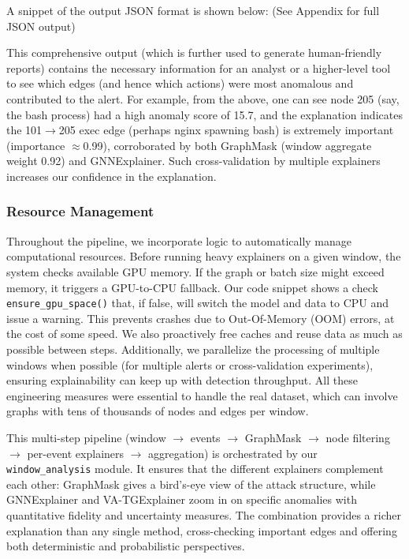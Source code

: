 \documentclass[conference]{IEEEtran}
\begin{document}
A snippet of the output JSON format is shown below:
(See Appendix for full JSON output)

This comprehensive output (which is further used to generate human-friendly reports) contains the necessary information for an analyst or a higher-level tool to see which edges (and hence which actions) were most anomalous and contributed to the alert. For example, from the above, one can see node 205 (say, the bash process) had a high anomaly score of 15.7, and the explanation indicates the 101$\rightarrow$205 exec edge (perhaps nginx spawning bash) is extremely important (importance $\approx$0.99), corroborated by both GraphMask (window aggregate weight 0.92) and GNNExplainer. Such cross-validation by multiple explainers increases our confidence in the explanation.

\subsubsection{Resource Management}
Throughout the pipeline, we incorporate logic to automatically manage computational resources. Before running heavy explainers on a given window, the system checks available GPU memory. If the graph or batch size might exceed memory, it triggers a GPU-to-CPU fallback. Our code snippet shows a check \texttt{ensure\_gpu\_space()} that, if false, will switch the model and data to CPU and issue a warning. This prevents crashes due to Out-Of-Memory (OOM) errors, at the cost of some speed. We also proactively free caches and reuse data as much as possible between steps. Additionally, we parallelize the processing of multiple windows when possible (for multiple alerts or cross-validation experiments), ensuring explainability can keep up with detection throughput. All these engineering measures were essential to handle the real dataset, which can involve graphs with tens of thousands of nodes and edges per window.

This multi-step pipeline (window $\rightarrow$ events $\rightarrow$ GraphMask $\rightarrow$ node filtering $\rightarrow$ per-event explainers $\rightarrow$ aggregation) is orchestrated by our \texttt{window\_analysis} module. It ensures that the different explainers complement each other: GraphMask gives a bird's-eye view of the attack structure, while GNNExplainer and VA-TGExplainer zoom in on specific anomalies with quantitative fidelity and uncertainty measures. The combination provides a richer explanation than any single method, cross-checking important edges and offering both deterministic and probabilistic perspectives.
\end{document}
